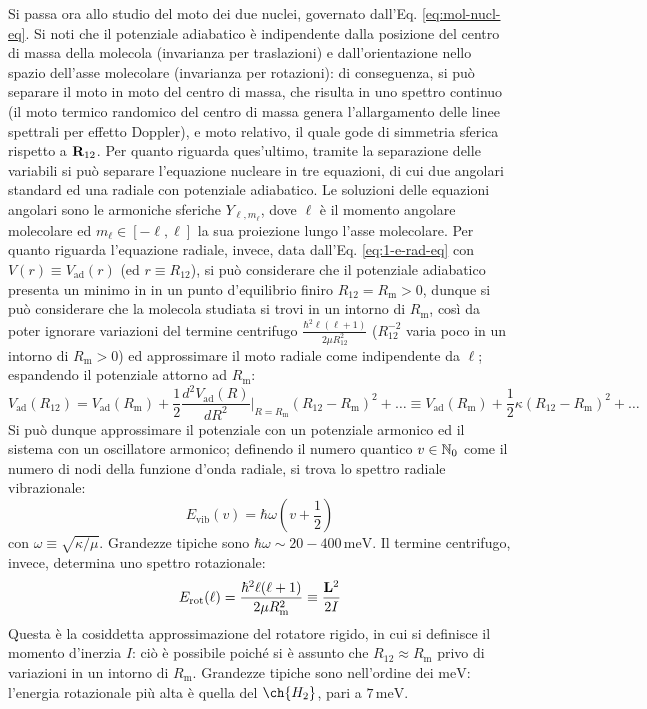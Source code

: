 Si passa ora allo studio del moto dei due nuclei, governato dall'Eq. \ref{eq:mol-nucl-eq}. Si noti che il potenziale adiabatico è indipendente dalla posizione del centro di massa della molecola (invarianza per traslazioni) e dall'orientazione nello spazio dell'asse molecolare (invarianza per rotazioni): di conseguenza, si può separare il moto in moto del centro di massa, che risulta in uno spettro continuo (il moto termico randomico del centro di massa genera l'allargamento delle linee spettrali per effetto Doppler), e moto relativo, il quale gode di simmetria sferica rispetto a $ \mathbf{R}_{12} $. Per quanto riguarda ques'ultimo, tramite la separazione delle variabili si può separare l'equazione nucleare in tre equazioni, di cui due angolari standard ed una radiale con potenziale adiabatico. Le soluzioni delle equazioni angolari sono le armoniche sferiche $ Y_{\ell,m_\ell} $, dove $ \ell $ è il momento angolare molecolare ed $ m_\ell \in [-\ell,\ell] $ la sua proiezione lungo l'asse molecolare. Per quanto riguarda l'equazione radiale, invece, data dall'Eq. \ref{eq:1-e-rad-eq} con $ V(r) \equiv V_\text{ad}(r) $ (ed $ r \equiv R_{12} $), si può considerare che il potenziale adiabatico presenta un minimo in in un punto d'equilibrio finiro $ R_{12} = R_\text{m} > 0 $, dunque si può considerare che la molecola studiata si trovi in un intorno di $ R_\text{m} $, così da poter ignorare variazioni del termine centrifugo $ \frac{\hbar^2 \ell (\ell + 1)}{2\mu R_{12}^2} $ ($ R_{12}^{-2} $ varia poco in un intorno di $ R_\text{m} > 0 $) ed approssimare il moto radiale come indipendente da $ \ell $; espandendo il potenziale attorno ad $ R_\text{m} $:
\begin{equation*}
	V_\text{ad}(R_{12}) = V_\text{ad}(R_\text{m}) + \frac{1}{2} \frac{d^2 V_\text{ad}(R)}{dR^2}\bigg\vert_{R = R_\text{m}} (R_{12} - R_\text{m})^2 + \dots \equiv V_\text{ad}(R_\text{m}) + \frac{1}{2} \kappa (R_{12} - R_\text{m})^2 + \dots
\end{equation*}
Si può dunque approssimare il potenziale con un potenziale armonico ed il sistema con un oscillatore armonico; definendo il numero quantico $ v \in \mathbb{N}_0 $ come il numero di nodi della funzione d'onda radiale, si trova lo spettro radiale vibrazionale:
\begin{equation}
	E_\text{vib}(v) = \hbar \omega \left( v + \frac{1}{2} \right)
\end{equation}
con $ \omega \equiv \sqrt{\kappa / \mu} $. Grandezze tipiche sono $ \hbar \omega \sim 20-400 \,\text{meV} $. Il termine centrifugo, invece, determina uno spettro rotazionale:
\begin{equation}
	E_\text{rot}(\ell) = \frac{\hbar^2 \ell (\ell + 1)}{2\mu R_\text{m}^2} \equiv \frac{\mathbf{L}^2}{2I}
\end{equation}
Questa è la cosiddetta approssimazione del rotatore rigido, in cui si definisce il momento d'inerzia $ I $: ciò è possibile poiché si è assunto che $ R_{12} \approx R_\text{m} $ privo di variazioni in un intorno di $ R_\text{m} $. Grandezze tipiche sono nell'ordine dei $ \text{meV} $: l'energia rotazionale più alta è quella del $ \ch{H_2} $, pari a $ 7 \,\text{meV} $.

